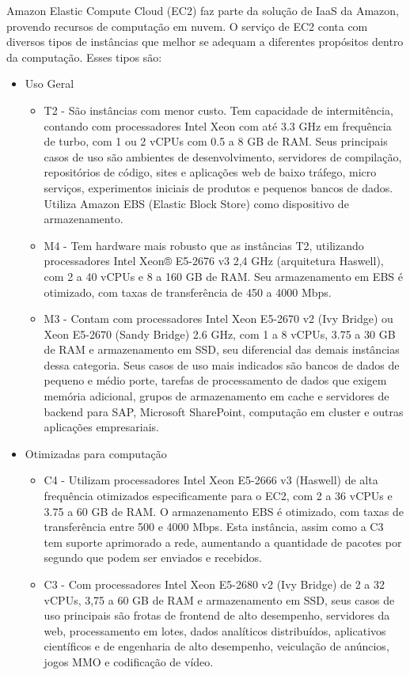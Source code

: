 \documentclass[tg]{mdtufsm}
\begin{document}
Amazon Elastic Compute Cloud (EC2) faz parte da solução de IaaS da Amazon, provendo recursos de computação em nuvem. O serviço de EC2 conta com diversos tipos de instâncias que melhor se adequam a diferentes propósitos dentro da computação. Esses tipos são:

\begin{itemize}
\item Uso Geral
	\begin{itemize}
	\item T2 - São instâncias com menor custo. Tem capacidade de intermitência, contando com processadores Intel Xeon com até 3.3 GHz em frequência de turbo, com 1 ou 2 vCPUs com 0.5 a 8 GB de RAM. Seus principais casos de uso são ambientes de desenvolvimento, servidores de compilação, repositórios de código, sites e aplicações web de baixo tráfego, micro serviços, experimentos iniciais de produtos e pequenos bancos de dados. Utiliza Amazon EBS (Elastic Block Store) como dispositivo de armazenamento.
	\item M4 - Tem hardware mais robusto que as instâncias T2, utilizando processadores Intel Xeon® E5-2676 v3 2,4 GHz (arquitetura Haswell), com 2 a 40 vCPUs e 8 a 160 GB de RAM. Seu armazenamento em EBS é otimizado, com taxas de transferência de 450 a 4000 Mbps.
	\item M3 - Contam com processadores Intel Xeon E5-2670 v2 (Ivy Bridge) ou Xeon E5-2670 (Sandy Bridge) 2.6 GHz, com 1 a 8 vCPUs, 3.75 a 30 GB de RAM e armazenamento em SSD, seu diferencial das demais instâncias dessa categoria. Seus casos de uso mais indicados são bancos de dados de pequeno e médio porte, tarefas de processamento de dados que exigem memória adicional, grupos de armazenamento em cache e servidores de backend para SAP, Microsoft SharePoint, computação em cluster e outras aplicações empresariais.
	\end{itemize}
\item Otimizadas para computação
	\begin{itemize}
	\item C4 - Utilizam processadores Intel Xeon E5-2666 v3 (Haswell) de alta frequência otimizados especificamente para o EC2, com 2 a 36 vCPUs e 3.75 a 60 GB de RAM. O armazenamento EBS é otimizado, com taxas de transferência entre 500 e 4000 Mbps. Esta instância, assim como a C3 tem suporte aprimorado a rede, aumentando a quantidade de pacotes por segundo que podem ser enviados e recebidos.
	\item C3 - Com processadores Intel Xeon E5-2680 v2 (Ivy Bridge) de 2 a 32 vCPUs, 3,75 a 60 GB de RAM e armazenamento em SSD, seus casos de uso principais são frotas de frontend de alto desempenho, servidores da web, processamento em lotes, dados analíticos distribuídos, aplicativos científicos e de engenharia de alto desempenho, veiculação de anúncios, jogos MMO e codificação de vídeo.

\end{itemize}
\end{itemize}
\end{document}
